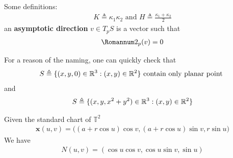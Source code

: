 \documentclass{report}
\begin{document}
\begin{mdframed}
Some definitions: 
\begin{align*}
K\triangleq \kappa_1 \kappa_2 \text{ and }H\triangleq \frac{\kappa_1 +\kappa_2}{2}
\end{align*}
an \textbf{asymptotic direction} $v\in T_pS$ is a vector such that 
\begin{align*}
\Sec_p(v)=0
\end{align*}
\end{mdframed}
\begin{mdframed}
For a reason of the naming, one can quickly check that 
\begin{align*}
S\triangleq \{ (x,y,0)\in\mathbb{R}^3:(x,y)\in\mathbb{R}^2 \}\text{ contain only planar point }
\end{align*}
and 
\begin{align*}
S\triangleq \{ (x,y,x^2+y^2)\in\mathbb{R}^3:(x,y)\in\mathbb{R}^2 \}
\end{align*}

\end{mdframed}
\begin{mdframed}
Given the standard chart of $\mathbb{T}^2$
\begin{align*}
\textbf{x}(u,v)=\Big((a+r \cos u)\cos v, (a+r \cos u)\sin v, r \sin u \Big)
\end{align*}
We have
\begin{align*}
N(u,v)=(\cos u \cos v, \cos u \sin v, \sin u)
\end{align*}

\end{mdframed}
\end{document}

